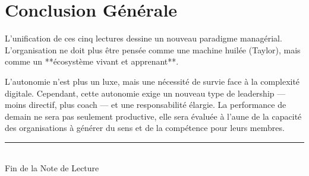 \documentclass[12pt,a4paper]{report}
\begin{document}

\section*{Conclusion Générale}
L'unification de ces cinq lectures dessine un nouveau paradigme managérial. L'organisation ne doit plus être pensée comme une machine huilée (Taylor), mais comme un **écosystème vivant et apprenant**. 

L'autonomie n'est plus un luxe, mais une nécessité de survie face à la complexité digitale. Cependant, cette autonomie exige un nouveau type de leadership — moins directif, plus coach — et une responsabilité élargie. La performance de demain ne sera pas seulement productive, elle sera évaluée à l'aune de la capacité des organisations à générer du sens et de la compétence pour leurs membres.

\vspace{2cm}
\begin{center}
    \rule{0.5\textwidth}{0.4pt} \\
    Fin de la Note de Lecture
\end{center}
\end{document}
